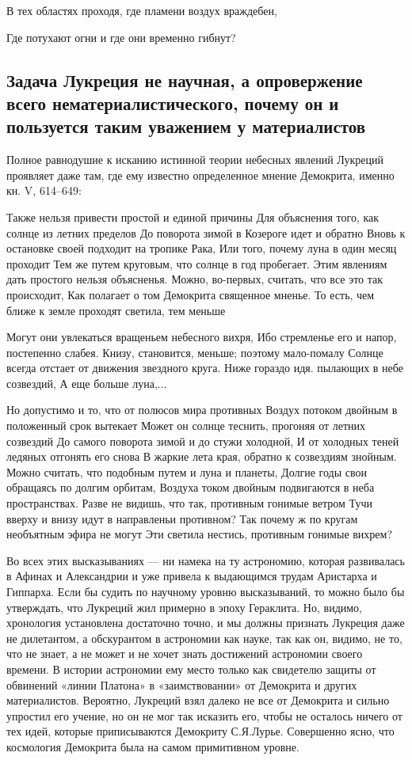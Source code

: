 В тех областях проходя, где пламени воздух враждебен,

Где потухают огни и где они временно гибнут?

\subsection{Задача   Лукреция  не   научная,   а  опровержение   всего
нематериалистического,  почему  он  и  пользуется  таким  уважением  у
материалистов}

Полное равнодушие к исканию  истинной теории небесных явлений Лукреций
проявляет даже  там, где  ему известно определенное  мнение Демокрита,
именно кн. V, 614--649:

Также нельзя  привести простой и  единой причины Для  объяснения того,
как солнце  из летних  пределов До  поворота зимой  в Козероге  идет и
обратно Вновь  к остановке своей  подходит на тропике Рака,  Или того,
почему луна в один месяц проходит  Тем же путем круговым, что солнце в
год пробегает.  Этим явлениям дать простого  нельзя объясненья. Можно,
во-первых, считать,  что все  это так происходит,  Как полагает  о том
Демокрита  священное  мненье. То  есть,  чем  ближе к  земле  проходят
светила, тем меньше

Могут  они увлекаться  вращеньем небесного  вихря, Ибо  стремленье его
и  напор,  постепенно  слабея.   Книзу,  становится,  меньше;  поэтому
мало-помалу Солнце  всегда отстает  от движения звездного  круга. Ниже
гораздо идя. пылающих в небе созвездий, А еще больше луна,...

Но  допустимо и  то,  что  от полюсов  мира  противных Воздух  потоком
двойным в положенный  срок вытекает Может он  солнце теснить, прогоняя
от летних созвездий До самого поворота зимой и до стужи холодной, И от
холодных теней ледяных отгонять его  снова В жаркие лета края, обратно
к  созвездиям знойным.  Можно считать,  что  подобным путем  и луна  и
планеты, Долгие годы  свои обращаясь по долгим  орбитам, Воздуха током
двойным подвигаются  в неба пространствах.  Разве не видишь,  что так,
противным  гонимые  ветром Тучи  вверху  и  внизу идут  в  направленьи
противном?  Так почему  ж  по  кругам необъятным  эфира  не могут  Эти
светила нестись, противным гонимые вихрем?

Во всех  этих высказываниях  --- ни намека  на ту  астрономию, которая
развивалась в Афинах  и Александрии и уже привела  к выдающимся трудам
Аристарха и Гиппарха. Если бы  судить по научному уровню высказываний,
то  можно  было бы  утверждать,  что  Лукреций  жил примерно  в  эпоху
Гераклита.  Но, видимо,  хронология  установлена  достаточно точно,  и
мы  должны  признать Лукреция  даже  не  дилетантом, а  обскурантом  в
астрономии как науке,  так как он, видимо,  не то, что не  знает, а не
может и не хочет знать достижений астрономии своего времени. В истории
астрономии ему место  только как свидетелю защиты  от обвинений «линии
Платона»  в  «заимствовании»  от  Демокрита  и  других  материалистов.
Вероятно, Лукреций взял  далеко не все от Демокрита  и сильно упростил
его учение, но он не мог так исказить его, чтобы не осталось ничего от
тех идей, которые приписываются  Демокриту С.Я.Лурье. Совершенно ясно,
что космология Демокрита была на самом примитивном уровне.

